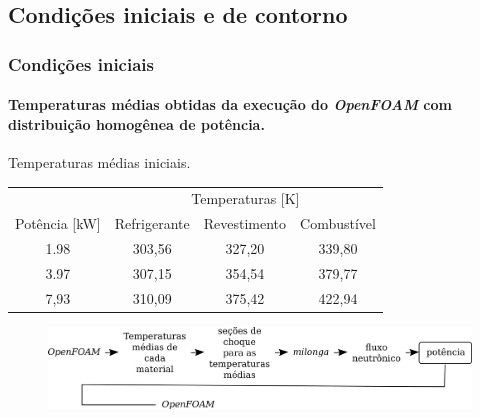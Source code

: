 \documentclass[svgnames,smaller,table]{beamer}
\begin{document}
\subsection{Condições iniciais e de contorno}
\begin{frame}
  \frametitle{Condições iniciais}
  \framesubtitle{Temperaturas médias obtidas da execução do \textit{OpenFOAM} com distribuição homogênea de potência.}
  
    \centering
    Temperaturas médias iniciais.
    \\
    \vspace{0.5cm}
    \label{tab:temp-keff}
    \begin{tabular}{cccc}
      \multicolumn{1}{l}{}         & \multicolumn{3}{c}{Temperaturas [K]}                                                                        \\ \cline{2-4}
      \multicolumn{1}{c}{Potência [kW]} & \multicolumn{1}{c}{Refrigerante} & \multicolumn{1}{c}{Revestimento} & \multicolumn{1}{c}{Combustível}  \\ \hline
      1.98                      & 303,56                         & 327,20                         & 339,80                           \\ \hline
      3.97                      & 307,15                         & 354,54                         & 379,77                           \\ \hline
      7,93                      & 310,09                         & 375,42                         & 422,94                                         
    \end{tabular}
    \vspace{0.5cm}
    \begin{figure}[htb]
    \centering\includegraphics[scale=0.6]{../figuras/initial-condition.png}
    \end{figure}
    \end{frame}
\end{document}
